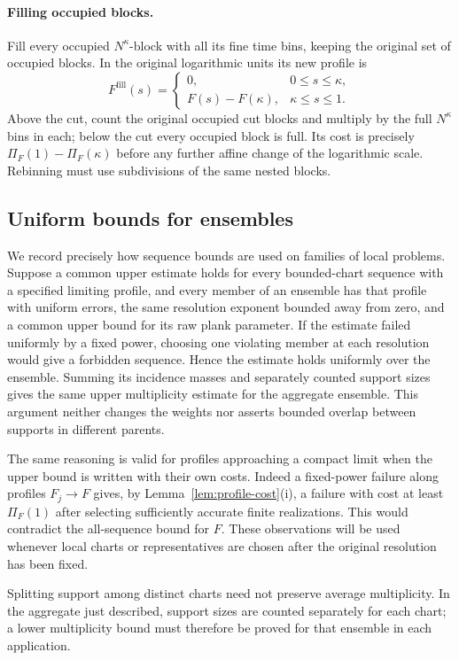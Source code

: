\paragraph{Filling occupied blocks.}
Fill every occupied $N^\kappa$-block with all its fine time
bins, keeping the original set of occupied blocks.  In the original
logarithmic units its new profile is
\[
 F^{\mathrm{fill}}(s)=
 \begin{cases}
 0,&0\le s\le\kappa,\\
 F(s)-F(\kappa),&\kappa\le s\le1.
 \end{cases}
\]
Above the cut, count the original occupied cut blocks and multiply by the
full $N^\kappa$ bins in each; below the cut every occupied block is full.
Its cost is precisely $\Pi_F(1)-\Pi_F(\kappa)$ before any further affine
change of the logarithmic scale.  Rebinning must use subdivisions of the
same nested blocks.

\subsection{Uniform bounds for ensembles}

We record precisely how sequence bounds are used on families of local
problems.  Suppose a common upper estimate holds for every bounded-chart
sequence with a specified limiting profile, and every member of an
ensemble has that profile with uniform errors, the same resolution
exponent bounded away from zero, and a common upper bound for its raw plank
parameter.  If the estimate failed uniformly by a fixed power, choosing
one violating member at each resolution would give a forbidden sequence.
Hence the estimate holds uniformly over the ensemble.  Summing its
incidence masses and separately counted support sizes gives the same
upper multiplicity estimate for the aggregate ensemble.  This argument
neither changes the weights nor asserts bounded overlap between supports
in different parents.

The same reasoning is valid for profiles approaching a compact limit when
the upper bound is written with their own costs.  Indeed a fixed-power
failure along profiles $F_j\to F$ gives, by
Lemma~\ref{lem:profile-cost}(i), a failure with cost at least $\Pi_F(1)$
after selecting sufficiently accurate finite realizations.  This would
contradict the all-sequence bound for $F$.  These observations will be used
whenever local charts or representatives are chosen after the original
resolution has been fixed.

Splitting support among distinct charts need not preserve average
multiplicity. In the aggregate just described, support sizes are counted
separately for each chart; a lower multiplicity bound must therefore be
proved for that ensemble in each application.

